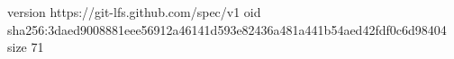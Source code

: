 version https://git-lfs.github.com/spec/v1
oid sha256:3daed9008881eee56912a46141d593e82436a481a441b54aed42fdf0c6d98404
size 71
